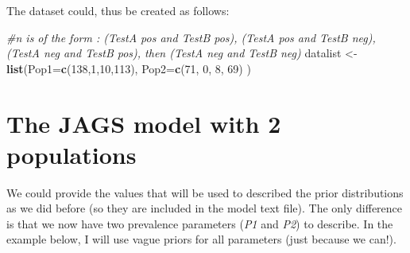 \documentclass[
]{book}
\newenvironment{Shaded}{\begin{snugshade}}{\end{snugshade}}
\newcommand{\AttributeTok}[1]{\textcolor[rgb]{0.13,0.29,0.53}{#1}}
\newcommand{\CommentTok}[1]{\textcolor[rgb]{0.56,0.35,0.01}{\textit{#1}}}
\newcommand{\DecValTok}[1]{\textcolor[rgb]{0.00,0.00,0.81}{#1}}
\newcommand{\FunctionTok}[1]{\textcolor[rgb]{0.13,0.29,0.53}{\textbf{#1}}}
\newcommand{\NormalTok}[1]{#1}
\newcommand{\OtherTok}[1]{\textcolor[rgb]{0.56,0.35,0.01}{#1}}
\begin{document}
The dataset could, thus be created as follows:

\begin{Shaded}
\begin{Highlighting}[]
\CommentTok{\#n is of the form : (TestA pos and TestB pos), (TestA pos and TestB neg), (TestA neg and TestB pos), then (TestA neg and TestB neg)}
\NormalTok{datalist }\OtherTok{\textless{}{-}} \FunctionTok{list}\NormalTok{(}\AttributeTok{Pop1=}\FunctionTok{c}\NormalTok{(}\DecValTok{138}\NormalTok{,}\DecValTok{1}\NormalTok{,}\DecValTok{10}\NormalTok{,}\DecValTok{113}\NormalTok{),}
                 \AttributeTok{Pop2=}\FunctionTok{c}\NormalTok{(}\DecValTok{71}\NormalTok{, }\DecValTok{0}\NormalTok{, }\DecValTok{8}\NormalTok{, }\DecValTok{69}\NormalTok{)}
\NormalTok{                 )}
\end{Highlighting}
\end{Shaded}

\section{The JAGS model with 2 populations}\label{the-jags-model-with-2-populations}

We could provide the values that will be used to described the prior distributions as we did before (so they are included in the model text file). The only difference is that we now have two prevalence parameters (\emph{P1} and \emph{P2}) to describe. In the example below, I will use vague priors for all parameters (just because we can!).
\end{document}
